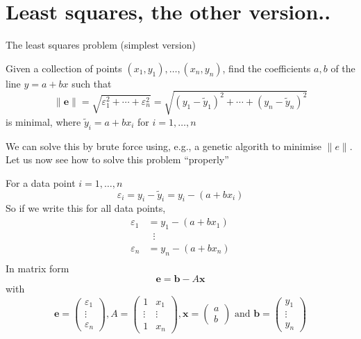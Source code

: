 \documentclass{beamer}
\def\bb{\mathbf{b}}
\def\be{\mathbf{e}}
\def\bx{\mathbf{x}}
\def\b0{\mathbf{0}}
\begin{document}
\section{Least squares, the other version..}

\begin{frame}{The least squares problem (simplest version)}
	\begin{definition}
		Given a collection of points $(x_1,y_1),\ldots,(x_n,y_n)$, find the coefficients $a,b$ of the line $y=a+bx$ such that
		$$
		\|\mathbf{e}\|=\sqrt{\varepsilon_1^2+\cdots+\varepsilon_n^2}
		=\sqrt{(y_1-\tilde y_1)^2+\cdots+(y_n-\tilde y_n)^2}
		$$
		is minimal, where $\tilde y_i=a+bx_i$ for $i=1,\ldots,n$
	\end{definition}
	\vfill
	We can solve this by brute force using, e.g., a genetic algorith to minimise $\|e\|$. Let us now see how to solve this problem ``properly''
\end{frame}


\begin{frame}
	For a data point $i=1,\ldots,n$
	\[
	\varepsilon_i = y_i-\tilde y_i = y_i - (a+bx_i)
	\]
	So if we write this for all data points,
	\begin{align*}
	\varepsilon_1 &= y_1 - (a+bx_1) \\
	&\;\;\vdots \\
	\varepsilon_n &= y_n - (a+bx_n) \\
	\end{align*}
	In matrix form
	\[
	\be = \bb-A\bx
	\]
	with
	\[
	\be = \begin{pmatrix}
	\varepsilon_1\\ \vdots\\ \varepsilon_n
	\end{pmatrix},
	A=\begin{pmatrix}
	1 & x_1 \\ \vdots & \vdots \\ 1 & x_n
	\end{pmatrix},
	\bx = \begin{pmatrix}
	a\\b
	\end{pmatrix}\textrm{ and }
	\bb = \begin{pmatrix}
	y_1\\ \vdots\\ y_n
	\end{pmatrix}
	\]
\end{frame}
\end{document}
